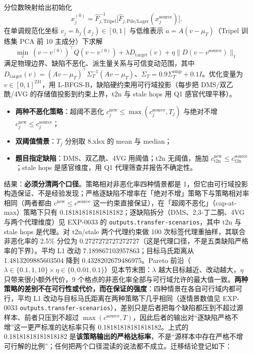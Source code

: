 \documentclass[
  11pt,
]{article}
\providecommand{\tightlist}{%
  \setlength{\itemsep}{0pt}\setlength{\parskip}{0pt}}
\begin{document}
分位数映射给出初始化 \[
x_j^{(0)}=\widehat F_{j,\mathrm{Tripel}}^{-1}\big[\widehat F_{j,\mathrm{Pils/Lager}}(x_j^{\mathrm{source}})\big].
\] 在单调规范化坐标 \(v_j=h_j(x_j)\in[0,1]\) 与低维表示
\(a=A(v-\mu_T)\)（Tripel 训练集 PCA 前 10 主成分）下求解 \[
\min_v\ (v-v^{(0)})^\top Q(v-v^{(0)})+\lambda D_{\mathrm{target}}(v)+\eta\|D(v-v^{\mathrm{source}})\|_1
\] 满足物理边界、缺陷不恶化、派生量关系与可信变动范围，其中
\(D_{\mathrm{target}}(v)=(Av-\mu_T)^\top\Sigma_T^{-1}(Av-\mu_T)\)、\(\Sigma_T=0.9\Sigma_T^{\mathrm{emp}}+0.1I\)。优化变量为
\(v\in[0,1]^{231}\)，用 L-BFGS-B，缺陷硬约束用可行域投影（每步把
DMS/双乙酰/4VG 的存储值投影到约束上界，t2n 与 stale hops 用 Q1
感官代理平移）。

\begin{itemize}
\tightlist
\item
  \textbf{两种不恶化策略}：超阈不恶化
  \(c_j^{\mathrm{new}}\le\max(c_j^{\mathrm{source}},T_j)\) 与绝对不增
  \(c_j^{\mathrm{new}}\le c_j^{\mathrm{source}}\)；
\item
  \textbf{双阈值情景}：\(T_j\) 分别取 8.xlsx 的 mean 与 median；
\item
  \textbf{题目指定缺陷}：DMS、双乙酰、4VG 用阈值；t2n 无阈值，施加
  \(c_{\mathrm{t2n}}^{\mathrm{new}}\le c_{\mathrm{t2n}}^{\mathrm{source}}\)；stale
  hops 是感官维度，用 Q1 代理筛查并报告不确定性。
\end{itemize}

结果：\textbf{必须分清两个口径}。策略相对非恶化率四种情景都是
1，但它由可行域投影构造保证、不是经验发现；严格逐缺陷不增率在「绝对不增」策略下与策略相对率相同（两者都由
\(c^{\mathrm{new}}\le c^{\mathrm{source}}\)
这一约束直接保证），在「超阈不恶化」（cap-at-max）策略下只有
0.18181818181818182；逐缺陷拆分（DMS、2,3-丁二酮、4VG 与两个代理维度）见
EXP-0033 的 \texttt{outputs.transfer-scenarios}，其中 t2n 与 stale hops
是代理。对 t2n/stale 两个代理约束做 100
次标签代理重抽样，其联合非恶化率的 2.5\% 分位为
0.2727272727272727（这是代理口径，不是五类缺陷严格率的下界）。平均 L1
改动 7.189867103957863；目标马氏距离从 1.4813209885603504 降到
0.4328202679486975。Pareto
前沿（\(\lambda\in\{0.1,1,10\}\times\eta\in\{0,0.01,0.1\}\)）见本节末图：\(\lambda\)
越大目标越近、改动越大，\(\eta\) 只带来很小额外代价，9
个格点的非恶化率全部与可行域允许的最大值一致。\textbf{两种策略的差别不在可行性或代价，而在保证的强度}：四种情景在各自可行域内都可行，平均
L1 改动与目标马氏距离在两种策略下几乎相同（逐情景数值见 EXP-0033
\texttt{outputs.transfer-scenarios}），差别只是后者把每个缺陷都压到不超过源样本、前者只压到不超过
\(\max(c^{\mathrm{source}},T)\)，因此后者的输出对``逐缺陷严格不增''这一更严标准的达标率只有
0.18181818181818182。上式的 0.18181818181818182
是\textbf{该策略输出的严格达标率}，不是``源样本中存在严格不增可行解的比例''；任何把两个口径混读的说法都不成立。迁移结论登记如下：
\end{document}

